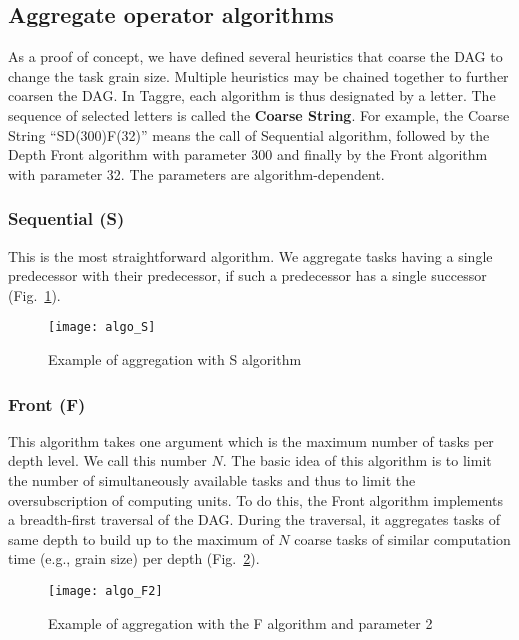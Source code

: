 \subsection{Aggregate operator algorithms}
As a proof of concept, we have defined several heuristics that
coarse the DAG to change the task grain size.
Multiple heuristics may be
chained together to further coarsen the DAG. In Taggre, each algorithm is
thus designated by a letter. The sequence of selected letters is
called the  {\bf Coarse String}. For example, the Coarse String
``SD(300)F(32)'' means the call of Sequential algorithm, followed
by the Depth Front algorithm with parameter 300 and finally by the
Front algorithm with parameter 32. The parameters are
algorithm-dependent.

\subsubsection{Sequential (S)}
This is the most straightforward algorithm. We aggregate
tasks having a single predecessor with their predecessor, if such
a predecessor has a single successor (Fig.~\ref{fig:S_algo}).
\begin{figure}[t!]
  \centering
  \texttt{[image: algo\_S]}
  \caption{Example of aggregation with S algorithm}
  \label{fig:S_algo}
\end{figure}


\subsubsection{Front (F)}
This algorithm takes one argument which is the maximum number of
tasks per depth level. We call this number $N$. The basic idea of
this algorithm is to limit the number of simultaneously available
tasks and thus to limit the oversubscription of computing units.
To do this, the Front algorithm implements a breadth-first traversal
of the DAG. During the traversal, it aggregates tasks of same
depth to build up to the maximum of $N$ coarse tasks of similar computation
time (e.g., grain size) per depth (Fig.~\ref{fig:F_algo}).

\begin{figure}[t!]
  \centering
  \texttt{[image: algo\_F2]}
  \caption{Example of aggregation with the F algorithm and parameter 2}
  \label{fig:F_algo}
\end{figure}


